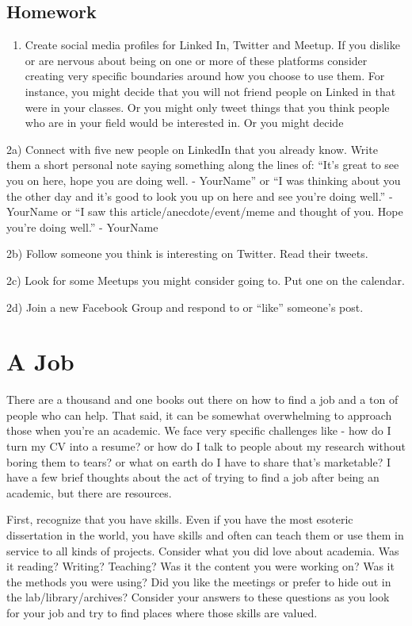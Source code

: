 \documentclass[]{book}
\providecommand{\tightlist}{%
  \setlength{\itemsep}{0pt}\setlength{\parskip}{0pt}}
\begin{document}
\section{Homework}\label{homework-1}

\begin{enumerate}
\def\labelenumi{\arabic{enumi})}
\tightlist
\item
  Create social media profiles for Linked In, Twitter and Meetup. If you
  dislike or are nervous about being on one or more of these platforms
  consider creating very specific boundaries around how you choose to
  use them. For instance, you might decide that you will not friend
  people on Linked in that were in your classes. Or you might only tweet
  things that you think people who are in your field would be interested
  in. Or you might decide
\end{enumerate}

2a) Connect with five new people on LinkedIn that you already know.
Write them a short personal note saying something along the lines of:
``It's great to see you on here, hope you are doing well. - YourName''
or ``I was thinking about you the other day and it's good to look you up
on here and see you're doing well.'' - YourName or ``I saw this
article/anecdote/event/meme and thought of you. Hope you're doing
well.'' - YourName

2b) Follow someone you think is interesting on Twitter. Read their
tweets.

2c) Look for some Meetups you might consider going to. Put one on the
calendar.

2d) Join a new Facebook Group and respond to or ``like'' someone's post.

\chapter{A Job}\label{a-job}

There are a thousand and one books out there on how to find a job and a
ton of people who can help. That said, it can be somewhat overwhelming
to approach those when you're an academic. We face very specific
challenges like - how do I turn my CV into a resume? or how do I talk to
people about my research without boring them to tears? or what on earth
do I have to share that's marketable? I have a few brief thoughts about
the act of trying to find a job after being an academic, but there are
resources.

First, recognize that you have skills. Even if you have the most
esoteric dissertation in the world, you have skills and often can teach
them or use them in service to all kinds of projects. Consider what you
did love about academia. Was it reading? Writing? Teaching? Was it the
content you were working on? Was it the methods you were using? Did you
like the meetings or prefer to hide out in the lab/library/archives?
Consider your answers to these questions as you look for your job and
try to find places where those skills are valued.
\end{document}
